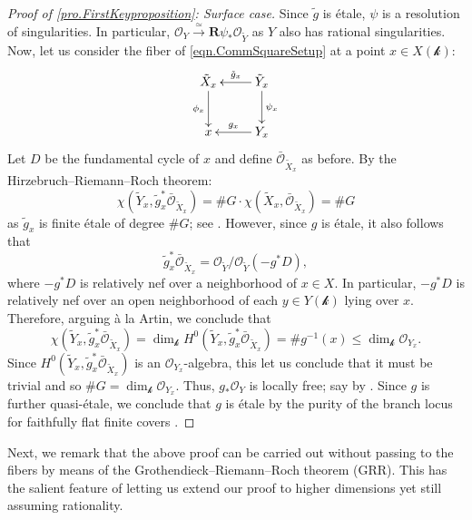 \documentclass[12pt]{amsart}
\theoremstyle{plain}   %
\theoremstyle{definition}    %
\theoremstyle{remark}    %
\numberwithin{equation}{theorem}
\newcommand{\kay}{\mathcal{k}}
\newcommand{\sO}{\mathcal{O}}
\begin{document}
\begin{proof}[Proof of \autoref{pro.FirstKeyproposition}: Surface case]
Since $\tilde{g}$ is \'etale, $\psi$ is a resolution of singularities. In particular, $\sO_Y \xrightarrow{\simeq} \mathbf{R} \psi_* \sO_{\tilde{Y}}$ as $Y$ also has rational singularities. Now, let us consider the fiber of \autoref{eqn.CommSquareSetup} at a point $x \in X(\kay)$:
\begin{equation} \label{eqn.FiberDiagram}
\xymatrix{\tilde{X}_x \ar[d]_-{\phi_x} & \tilde{Y}_x \ar[d]^-{\psi_x} \ar[l]_-{\tilde{g}_x} \\x & Y_x 
\ar[l]_-{g_x}}
\end{equation}
Let $D$ be the fundamental cycle of $x$ and define $\bar{\sO}_{\tilde{X}_x}$ as before. By the Hirzebruch--Riemann--Roch theorem: 
\[
  \chi(\tilde{Y}_x,\tilde{g}_x^* \bar{\sO}_{\tilde{X}_x}) = \# G \cdot \chi(\tilde{X}_x, \bar{\sO}_{\tilde{X}_x}) = \# G \] as $\tilde{g}_x$ is finite \'etale of degree $\# G$; see \cite[Example 18.3.9]{FultonIntersection}. However, since $g$ is \'etale, it also follows that
\[
\tilde{g}_x^* \bar{\sO}_{\tilde{X}_x} = \sO_{\tilde{Y}}/\sO_{\tilde{Y}}(-g^* D),
\]
where $-g^* D$ is relatively nef over a neighborhood of $x \in X$. In particular, $-g^* D$ is relatively nef over an open neighborhood of each $y \in Y(\kay)$ lying over $x$. Therefore, arguing à la Artin, we conclude that 
\[
 \chi(\tilde{Y}_x,\tilde{g}_x^* \bar{\sO}_{\tilde{X}_x}) = \dim_{\kay} H^0(\tilde{Y}_x,\tilde{g}_x^* \bar{\sO}_{\tilde{X}_x}) = \# g^{-1}(x) \leq \dim_{\kay} \sO_{Y_x}.
\]
Since $H^0(\tilde{Y}_x,\tilde{g}_x^* \bar{\sO}_{\tilde{X}_x})$ is an $\sO_{Y_x}$-algebra, this let us conclude that it must be trivial and so $\# G = \dim_{\kay} \sO_{Y_x}$. Thus, $g_* \sO_Y$ is locally free; say by \cite[II, Exercise 5.8.(c)]{Hartshorne}. Since $g$ is further quasi-\'etale, we conclude that $g$ is \'etale by the purity of the branch locus for faithfully flat finite covers \cite[VI, Theorem 6.8]{AltmanKleimanIntroToGrothendieckDuality}.
\end{proof}

Next, we remark that the above proof can be carried out without passing to the fibers by means of the Grothendieck--Riemann--Roch theorem (GRR). This has the salient feature of letting us extend our proof to higher dimensions yet still assuming rationality.
\end{document}

